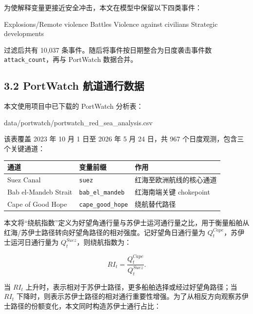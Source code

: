 \documentclass[
]{ctexart}
\newenvironment{Shaded}{}{}
\newcommand{\NormalTok}[1]{#1}
\begin{document}
为使解释变量更接近安全冲击，本文在模型中保留以下四类事件：

\begin{Shaded}
\begin{Highlighting}[]
\NormalTok{Explosions/Remote violence}
\NormalTok{Battles}
\NormalTok{Violence against civilians}
\NormalTok{Strategic developments}
\end{Highlighting}
\end{Shaded}

过滤后共有 10,037 条事件。随后将事件按日期整合为日度袭击事件数
\texttt{attack\_count}，再与 PortWatch 数据合并。

\subsection{3.2 PortWatch
航道通行数据}\label{portwatch-ux822aux9053ux901aux884cux6570ux636e}

本文使用项目中已下载的 PortWatch 分析表：

\begin{Shaded}
\begin{Highlighting}[]
\NormalTok{data/portwatch/portwatch\_red\_sea\_analysis.csv}
\end{Highlighting}
\end{Shaded}

该表覆盖 2023 年 10 月 1 日至 2026 年 5 月 24 日，共 967 个日度观测，包含三个关键通道：

\begin{longtable}[]{@{}lll@{}}
\toprule\noalign{}
通道 & 变量前缀 & 作用 \\
\midrule\noalign{}
\endhead
\bottomrule\noalign{}
\endlastfoot
Suez Canal & \texttt{suez} & 红海至欧洲航线的核心通道 \\
Bab el-Mandeb Strait & \texttt{bab\_el\_mandeb} & 红海南端关键
chokepoint \\
Cape of Good Hope & \texttt{cape\_good\_hope} & 绕航替代路径 \\
\end{longtable}

本文将``绕航指数''定义为好望角通行量与苏伊士运河通行量之比，用于衡量船舶从红海/苏伊士路径转向好望角路径的相对强度。记好望角日通行量为
\(Q^{Cape}_t\)，苏伊士运河日通行量为 \(Q^{Suez}_t\)，则绕航指数为：

\[
RI_t=\frac{Q^{Cape}_t}{Q^{Suez}_t}.
\]

当 \(RI_t\)
上升时，表示相对于苏伊士路径，更多船舶选择或经过好望角路径；当
\(RI_t\)
下降时，则表示苏伊士路径的相对通行重要性增强。为了从相反方向观察苏伊士路径的份额变化，本文同时构造苏伊士通行占比：
\end{document}
